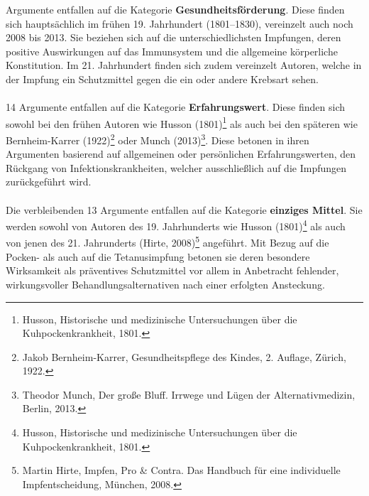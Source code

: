 \documentclass[
    a4paper,
    12pt,
    hyphens,
    chapterprefix=true,
    headheight=33pt,
    footheight=29pt,
    headings=optiontohead, %
]{scrartcl}
\begin{document}
{ Argumente entfallen auf die Kategorie \textbf{Gesundheitsförderung}. Diese finden sich hauptsächlich im frühen 19. Jahrhundert (1801--1830), vereinzelt auch noch 2008 bis 2013. Sie beziehen sich auf die unterschiedlichsten Impfungen, deren positive Auswirkungen auf das Immunsystem und die allgemeine körperliche Konstitution. Im 21. Jahrhundert finden sich zudem vereinzelt Autoren, welche in der Impfung ein Schutzmittel gegen die ein oder andere Krebsart sehen.\\
\\
14 Argumente entfallen auf die Kategorie \textbf{Erfahrungswert}. Diese finden sich sowohl bei den frühen Autoren wie Husson (1801)\footnote{Husson, Historische und medizinische Untersuchungen über die Kuhpockenkrankheit, 1801.} als auch bei den späteren wie
Bernheim-Karrer (1922)\footnote{Jakob Bernheim-Karrer, Gesundheitspflege des Kindes, 2. Auflage, Zürich, 1922.} oder Munch (2013)\footnote{Theodor Munch, Der große Bluff. Irrwege und Lügen der Alternativmedizin, Berlin, 2013.}. Diese betonen in ihren Argumenten basierend auf allgemeinen oder persönlichen Erfahrungswerten, den Rückgang von Infektionskrankheiten, welcher ausschließlich auf die Impfungen zurückgeführt wird.\\
\\
Die verbleibenden 13 Argumente entfallen auf die Kategorie \textbf{einziges Mittel}. Sie werden sowohl von Autoren des 19. Jahrhunderts wie Husson (1801)\footnote{Husson, Historische und medizinische Untersuchungen über die Kuhpockenkrankheit, 1801.} als auch von jenen des 21. Jahrunderts (Hirte, 2008)\footnote{Martin Hirte, Impfen, Pro \& Contra. Das Handbuch für eine individuelle Impfentscheidung, München, 2008.} angeführt. Mit Bezug auf die Pocken- als auch auf die Tetanusimpfung betonen sie deren besondere Wirksamkeit als präventives Schutzmittel vor allem in Anbetracht fehlender, wirkungsvoller Behandlungsalternativen nach einer erfolgten Ansteckung.

}
\end{document}
